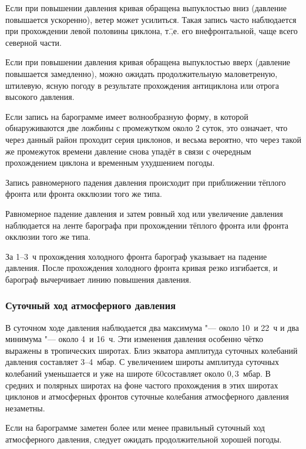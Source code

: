  Если при повышении давления кривая обращена выпуклостью вниз
(давление повышается ускоренно), ветер может усилиться. Такая запись
часто наблюдается при прохождении левой половины циклона, т.\=,е. его
внефронтальной, чаще всего северной части.

 Если при повышении давления кривая обращена выпуклостью вверх
(давление повышается замедленно), можно ожидать продолжительную
маловетреную, штилевую, ясную погоду в результате прохождения
антициклона или отрога высокого давления.

 Если запись на барограмме имеет волнообразную форму, в которой
обнаруживаются две ложбины с промежутком около 2 суток, это означает,
что через данный район проходит серия циклонов, и весьма вероятно, что
через такой же промежуток времени давление снова упадёт в связи с
очередным прохождением циклона и временным ухудшением погоды.

 Запись равномерного падения давления происходит при
приближении тёплого фронта или фронта окклюзии того же типа.

 Равномерное падение давления и затем ровный ход или увеличение
давления наблюдается на ленте барографа при прохождении тёплого фронта
или фронта окклюзии того же типа.

 За 1--3~ч прохождения холодного фронта барограф указывает на
падение давления. После прохождения холодного фронта кривая резко
изгибается, и барограф вычерчивает линию повышения давления.

\subsubsection{Суточный ход атмосферного давления}

В суточном ходе давления наблюдается два максимума "--- около 10~и 22~ч и
два минимума "--- около 4~и 16~ч. Эти изменения давления особенно чётко
выражены в тропических широтах. Близ экватора амплитуда суточных
колебаний давления составляет 3--4~мбар. С увеличением широты амплитуда
суточных колебаний уменьшается и уже на широте 60\gr составляет около
$0,3$~мбар. В средних и полярных широтах на фоне частого прохождения в
этих широтах циклонов и атмосферных фронтов суточные колебания
атмосферного давления незаметны.

 Если на барограмме заметен более или менее правильный суточный
ход атмосферного давления, следует ожидать продолжительной хорошей
погоды.

